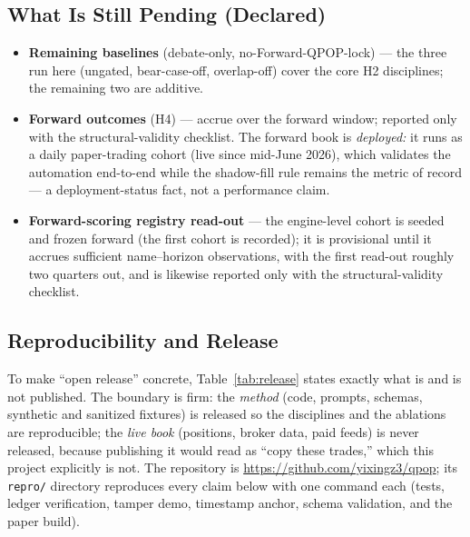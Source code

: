 \documentclass[11pt]{article}
\begin{document}
\subsection{What Is Still Pending (Declared)}

\begin{itemize}
  \item \textbf{Remaining baselines} (debate-only, no-Forward-QPOP-lock) ---
    the three run here (ungated, bear-case-off, overlap-off) cover the core H2
    disciplines; the remaining two are additive.
  \item \textbf{Forward outcomes} (H4) --- accrue over the forward window;
    reported only with the structural-validity checklist. The forward book is \emph{deployed:} it runs as
    a daily paper-trading cohort (live since mid-June 2026), which validates the automation end-to-end
    while the shadow-fill rule remains the metric of record --- a deployment-status fact, not a
    performance claim.
  \item \textbf{Forward-scoring registry read-out} --- the engine-level cohort is
    seeded and frozen forward (the first cohort is recorded); it is provisional until it
    accrues sufficient name--horizon observations, with the first read-out roughly two
    quarters out, and is likewise reported only with the structural-validity checklist.
\end{itemize}

\subsection{Reproducibility and Release}

To make ``open release'' concrete, Table~\ref{tab:release} states exactly what is
and is not published. The boundary is firm: the \emph{method} (code, prompts,
schemas, synthetic and sanitized fixtures) is released so the disciplines and the
ablations are reproducible; the \emph{live book} (positions, broker data, paid
feeds) is never released, because publishing it would read as ``copy these
trades,'' which this project explicitly is not. The repository is
\url{https://github.com/yixingz3/qpop}; its \texttt{repro/} directory reproduces every claim below
with one command each (tests, ledger verification, tamper demo, timestamp anchor, schema validation,
and the paper build).
\end{document}
